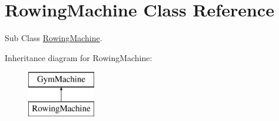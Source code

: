 \hypertarget{class_rowing_machine}{}\section{Rowing\+Machine Class Reference}
\label{class_rowing_machine}


Sub Class \hyperlink{class_rowing_machine}{Rowing\+Machine}.  


Inheritance diagram for Rowing\+Machine\+:\begin{figure}[H]
\begin{center}
\leavevmode
\includegraphics[height=2.000000cm]{class_rowing_machine}
\end{center}
\end{figure}

